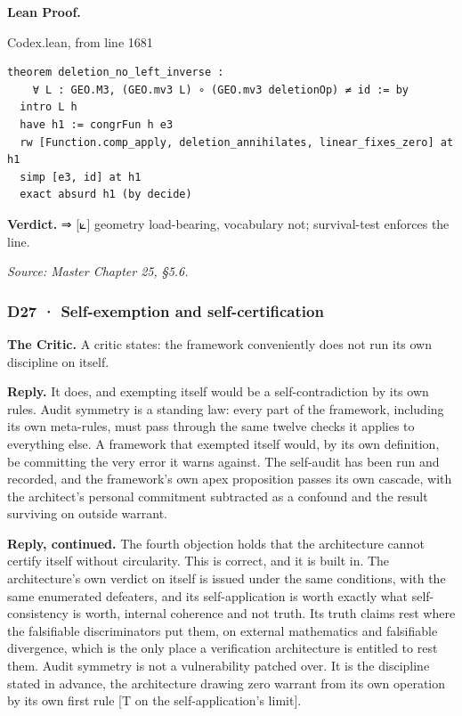 \documentclass[10pt,twocolumn]{article}
\begin{document}
\textbf{Lean Proof.}

\begin{leanexcerpt}{Codex.lean, from line 1681}
\begin{lstlisting}[style=leanx,firstnumber=1681]
theorem deletion_no_left_inverse :
    ∀ L : GEO.M3, (GEO.mv3 L) ∘ (GEO.mv3 deletionOp) ≠ id := by
  intro L h
  have h1 := congrFun h e3
  rw [Function.comp_apply, deletion_annihilates, linear_fixes_zero] at h1
  simp [e3, id] at h1
  exact absurd h1 (by decide)
\end{lstlisting}
\end{leanexcerpt}

\textbf{Verdict.} ⇒ {[}⟀{]} geometry load-bearing, vocabulary not;
survival-test enforces the line.

\emph{Source: Master Chapter 25, §5.6.}

\hypertarget{d27-self-exemption-and-self-certification}{%
\subsubsection{D27 · Self-exemption and
self-certification}\label{d27-self-exemption-and-self-certification}}

\textbf{The Critic.} A critic states: the framework conveniently does
not run its own discipline on itself.

\textbf{Reply.} It does, and exempting itself would be a
self-contradiction by its own rules. Audit symmetry is a standing law:
every part of the framework, including its own meta-rules, must pass
through the same twelve checks it applies to everything else. A
framework that exempted itself would, by its own definition, be
committing the very error it warns against. The self-audit has been run
and recorded, and the framework's own apex proposition passes its own
cascade, with the architect's personal commitment subtracted as a
confound and the result surviving on outside warrant.

\textbf{Reply, continued.} The fourth objection holds that the
architecture cannot certify itself without circularity. This is correct,
and it is built in. The architecture's own verdict on itself is issued
under the same conditions, with the same enumerated defeaters, and its
self-application is worth exactly what self-consistency is worth,
internal coherence and not truth. Its truth claims rest where the
falsifiable discriminators put them, on external mathematics and
falsifiable divergence, which is the only place a verification
architecture is entitled to rest them. Audit symmetry is not a
vulnerability patched over. It is the discipline stated in advance, the
architecture drawing zero warrant from its own operation by its own
first rule {[}T on the self-application's limit{]}.
\end{document}
